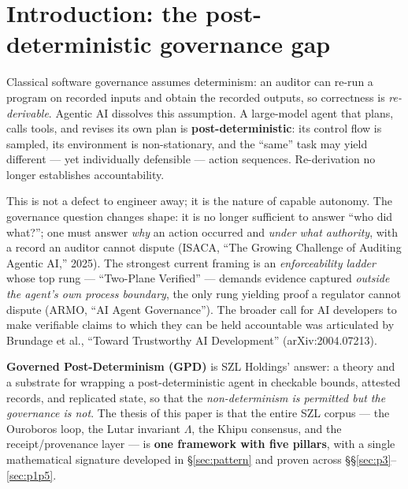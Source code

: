 \documentclass[11pt,letterpaper]{article}
\theoremstyle{definition}
\newcommand{\Lam}{\Lambda}
\begin{document}
\section{Introduction: the post-deterministic governance gap}

Classical software governance assumes determinism: an auditor can re-run a
program on recorded inputs and obtain the recorded outputs, so correctness is
\emph{re-derivable}. Agentic AI dissolves this assumption. A large-model agent
that plans, calls tools, and revises its own plan is \textbf{post-deterministic}:
its control flow is sampled, its environment is non-stationary, and the ``same''
task may yield different --- yet individually defensible --- action sequences.
Re-derivation no longer establishes accountability.

This is not a defect to engineer away; it is the nature of capable autonomy. The
governance question changes shape: it is no longer sufficient to answer ``who did
what?''; one must answer \emph{why} an action occurred and \emph{under what
authority}, with a record an auditor cannot dispute (ISACA, ``The Growing
Challenge of Auditing Agentic AI,'' 2025). The strongest current framing is an
\emph{enforceability ladder} whose top rung --- ``Two-Plane Verified'' ---
demands evidence captured \emph{outside the agent's own process boundary}, the
only rung yielding proof a regulator cannot dispute (ARMO, ``AI Agent
Governance''). The broader call for AI developers to make verifiable claims to
which they can be held accountable was articulated by Brundage et al.,
``Toward Trustworthy AI Development'' (arXiv:2004.07213).

\textbf{Governed Post-Determinism (GPD)} is SZL Holdings' answer: a theory and a
substrate for wrapping a post-deterministic agent in checkable bounds, attested
records, and replicated state, so that the \emph{non-determinism is permitted but
the governance is not}. The thesis of this paper is that the entire SZL corpus
--- the Ouroboros loop, the Lutar invariant $\Lam$, the Khipu consensus, and the
receipt/provenance layer --- is \textbf{one framework with five pillars}, with a
single mathematical signature developed in \S\ref{sec:pattern} and proven across
\S\S\ref{sec:p3}--\ref{sec:p1p5}.
\end{document}
